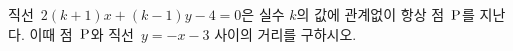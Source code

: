 직선~$2(k+1)x+(k-1)y-4=0$은 실수 $k$의 값에 관계없이 항상 점~$\mathrm{P}$를 지난다. 이때 점~$\mathrm{P}$와 직선~$y=-x-3$ 사이의 거리를 구하시오.
